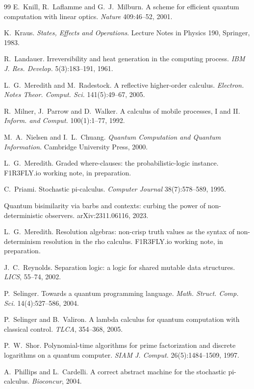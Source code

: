 \documentclass[11pt,a4paper]{article}
\theoremstyle{plain}
\theoremstyle{definition}
\theoremstyle{remark}
\begin{document}
\begin{thebibliography}{99}
 E.~Knill, R.~Laflamme and G.~J.~Milburn.
A scheme for efficient quantum computation with linear optics.
\emph{Nature} 409:46--52, 2001.

 K.~Kraus.
\emph{States, Effects and Operations}. Lecture Notes in Physics 190,
Springer, 1983.

 R.~Landauer.
Irreversibility and heat generation in the computing process.
\emph{IBM J. Res. Develop.} 5(3):183--191, 1961.

 L.~G.~Meredith and M.~Radestock.
A reflective higher-order calculus.
\emph{Electron. Notes Theor. Comput. Sci.} 141(5):49--67, 2005.

 R.~Milner, J.~Parrow and D.~Walker.
A calculus of mobile processes, I and II.
\emph{Inform. and Comput.} 100(1):1--77, 1992.

 M.~A.~Nielsen and I.~L.~Chuang.
\emph{Quantum Computation and Quantum Information}.
Cambridge University Press, 2000.

 L.~G.~Meredith.
Graded where-clauses: the probabilistic-logic instance.
F1R3FLY.io working note, in preparation.

 C.~Priami.
Stochastic pi-calculus. \emph{Computer Journal} 38(7):578--589, 1995.

 Quantum bisimilarity via barbs and contexts:
curbing the power of non-deterministic observers. arXiv:2311.06116, 2023.

 L.~G.~Meredith.
Resolution algebras: non-crisp truth values as the syntax of non-determinism
resolution in the rho calculus. F1R3FLY.io working note, in preparation.

 J.~C.~Reynolds.
Separation logic: a logic for shared mutable data structures.
\emph{LICS}, 55--74, 2002.

 P.~Selinger.
Towards a quantum programming language.
\emph{Math. Struct. Comp. Sci.} 14(4):527--586, 2004.

 P.~Selinger and B.~Valiron.
A lambda calculus for quantum computation with classical control.
\emph{TLCA}, 354--368, 2005.

 P.~W.~Shor.
Polynomial-time algorithms for prime factorization and discrete logarithms on a
quantum computer. \emph{SIAM J. Comput.} 26(5):1484--1509, 1997.

 A.~Phillips and L.~Cardelli.
A correct abstract machine for the stochastic pi-calculus.
\emph{Bioconcur}, 2004.


\end{thebibliography}
\end{document}
